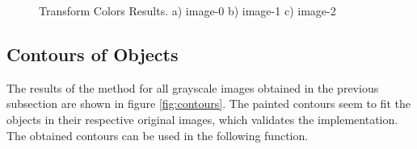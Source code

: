 \documentclass[]{IEEEtran}
\begin{document}
\begin{figure}[]
  \centering
  \caption{Transform Colors Results. a) image-0 b) image-1 c) image-2}
  \label{fig:transf-colors}
\end{figure}

\subsection{Contours of Objects}
The results of the method for all grayscale images obtained in the previous subsection are shown in figure \ref{fig:contours}. The painted contours seem to fit the objects in their respective original images, which validates the implementation. The obtained contours can be used in the following function.
\end{document}
